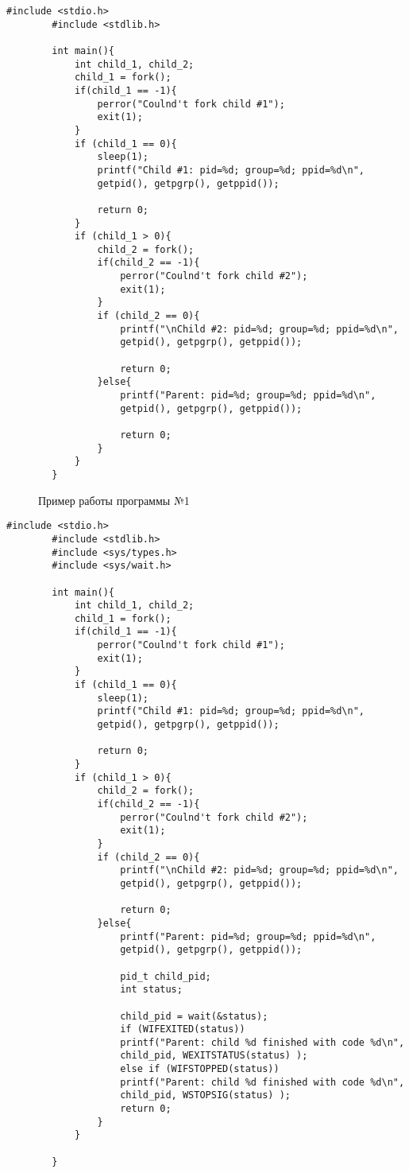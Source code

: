 \documentclass[12pt]{report}
\begin{document}
	\begin{lstlisting}[label=one,caption = Процессы-сироты, style = CStyle]
		#include <stdio.h>
		#include <stdlib.h>
		
		int main(){
			int child_1, child_2;
			child_1 = fork();
			if(child_1 == -1){
				perror("Coulnd't fork child #1");
				exit(1);
			}
			if (child_1 == 0){
				sleep(1);
				printf("Child #1: pid=%d; group=%d; ppid=%d\n",
				getpid(), getpgrp(), getppid());
				
				return 0;
			}
			if (child_1 > 0){
				child_2 = fork();
				if(child_2 == -1){
					perror("Coulnd't fork child #2");
					exit(1);
				}
				if (child_2 == 0){
					printf("\nChild #2: pid=%d; group=%d; ppid=%d\n",
					getpid(), getpgrp(), getppid());
					
					return 0;
				}else{
					printf("Parent: pid=%d; group=%d; ppid=%d\n",
					getpid(), getpgrp(), getppid());
					
					return 0;
				}
			}
		}
	\end{lstlisting}
	\begin{figure}[H]
		\caption{Пример работы программы №1}
		\label{ris:task1}
	\end{figure}
	\newpage
	\begin{lstlisting}[label=two,caption = Использование вызова wait(), style = CStyle]
		#include <stdio.h>
		#include <stdlib.h>
		#include <sys/types.h>
		#include <sys/wait.h>
		
		int main(){
			int child_1, child_2;
			child_1 = fork();
			if(child_1 == -1){
				perror("Coulnd't fork child #1");
				exit(1);
			}
			if (child_1 == 0){
				sleep(1);
				printf("Child #1: pid=%d; group=%d; ppid=%d\n",
				getpid(), getpgrp(), getppid());
				
				return 0;
			}
			if (child_1 > 0){
				child_2 = fork();
				if(child_2 == -1){
					perror("Coulnd't fork child #2");
					exit(1);
				}
				if (child_2 == 0){
					printf("\nChild #2: pid=%d; group=%d; ppid=%d\n",
					getpid(), getpgrp(), getppid());
					
					return 0;
				}else{	
					printf("Parent: pid=%d; group=%d; ppid=%d\n",
					getpid(), getpgrp(), getppid());
					
					pid_t child_pid;
					int status;
					
					child_pid = wait(&status);
					if (WIFEXITED(status))
					printf("Parent: child %d finished with code %d\n",
					child_pid, WEXITSTATUS(status) );
					else if (WIFSTOPPED(status))
					printf("Parent: child %d finished with code %d\n",
					child_pid, WSTOPSIG(status) );
					return 0;
				}
			}
			
		}
	\end{lstlisting}
\end{document}
